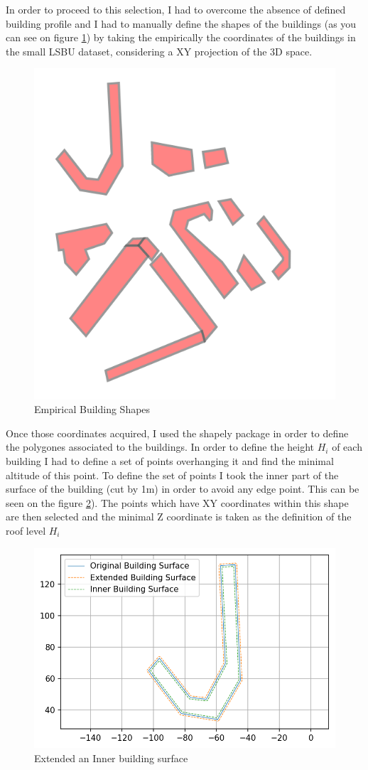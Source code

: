 In order to proceed to this selection, I had to overcome the absence of defined building profile and I had to manually define the shapes of the buildings (as you can see on figure \ref{fig:buildingshapes}) by taking the empirically the coordinates of the buildings in the small LSBU dataset, considering a XY projection of the 3D space. \\

\begin{figure}[h]
\centering
	\includegraphics[width = 0.25 \textwidth]{figures/Subset/buildingShapes_13}
	\caption{Empirical Building Shapes}
	\label{fig:buildingshapes}
\end{figure}

Once those coordinates acquired, I used the shapely package in order to define the polygones associated to the buildings. In order to define the height $H_i$ of each building I had to define a set of points overhanging it and find the minimal altitude of this point.  To define the set of points I took the inner part of the surface of the building (cut by 1m) in order to avoid any edge point. This can be seen on the figure \ref{fig:inner_outer_building}). The points which have XY coordinates within this shape are then selected and the minimal Z coordinate is taken as the definition of the roof level $H_i$ \\


\begin{figure}[h]
\centering
	\includegraphics[width = 0.7 \textwidth]{figures/Subset/BuildingSurfaceBuffer}
	\caption{Extended an Inner building surface}
	\label{fig:inner_outer_building}
\end{figure}

